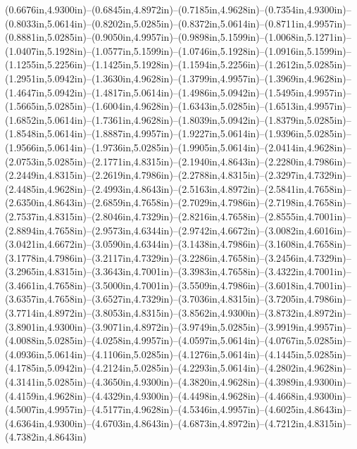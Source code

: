 (0.6676in,4.9300in)--(0.6845in,4.8972in)--(0.7185in,4.9628in)--(0.7354in,4.9300in)--(0.8033in,5.0614in)--(0.8202in,5.0285in)--(0.8372in,5.0614in)--(0.8711in,4.9957in)--(0.8881in,5.0285in)--(0.9050in,4.9957in)--(0.9898in,5.1599in)--(1.0068in,5.1271in)--(1.0407in,5.1928in)--(1.0577in,5.1599in)--(1.0746in,5.1928in)--(1.0916in,5.1599in)--(1.1255in,5.2256in)--(1.1425in,5.1928in)--(1.1594in,5.2256in)--(1.2612in,5.0285in)--(1.2951in,5.0942in)--(1.3630in,4.9628in)--(1.3799in,4.9957in)--(1.3969in,4.9628in)--(1.4647in,5.0942in)--(1.4817in,5.0614in)--(1.4986in,5.0942in)--(1.5495in,4.9957in)--(1.5665in,5.0285in)--(1.6004in,4.9628in)--(1.6343in,5.0285in)--(1.6513in,4.9957in)--(1.6852in,5.0614in)--(1.7361in,4.9628in)--(1.8039in,5.0942in)--(1.8379in,5.0285in)--(1.8548in,5.0614in)--(1.8887in,4.9957in)--(1.9227in,5.0614in)--(1.9396in,5.0285in)--(1.9566in,5.0614in)--(1.9736in,5.0285in)--(1.9905in,5.0614in)--(2.0414in,4.9628in)--(2.0753in,5.0285in)--(2.1771in,4.8315in)--(2.1940in,4.8643in)--(2.2280in,4.7986in)--(2.2449in,4.8315in)--(2.2619in,4.7986in)--(2.2788in,4.8315in)--(2.3297in,4.7329in)--(2.4485in,4.9628in)--(2.4993in,4.8643in)--(2.5163in,4.8972in)--(2.5841in,4.7658in)--(2.6350in,4.8643in)--(2.6859in,4.7658in)--(2.7029in,4.7986in)--(2.7198in,4.7658in)--(2.7537in,4.8315in)--(2.8046in,4.7329in)--(2.8216in,4.7658in)--(2.8555in,4.7001in)--(2.8894in,4.7658in)--(2.9573in,4.6344in)--(2.9742in,4.6672in)--(3.0082in,4.6016in)--(3.0421in,4.6672in)--(3.0590in,4.6344in)--(3.1438in,4.7986in)--(3.1608in,4.7658in)--(3.1778in,4.7986in)--(3.2117in,4.7329in)--(3.2286in,4.7658in)--(3.2456in,4.7329in)--(3.2965in,4.8315in)--(3.3643in,4.7001in)--(3.3983in,4.7658in)--(3.4322in,4.7001in)--(3.4661in,4.7658in)--(3.5000in,4.7001in)--(3.5509in,4.7986in)--(3.6018in,4.7001in)--(3.6357in,4.7658in)--(3.6527in,4.7329in)--(3.7036in,4.8315in)--(3.7205in,4.7986in)--(3.7714in,4.8972in)--(3.8053in,4.8315in)--(3.8562in,4.9300in)--(3.8732in,4.8972in)--(3.8901in,4.9300in)--(3.9071in,4.8972in)--(3.9749in,5.0285in)--(3.9919in,4.9957in)--(4.0088in,5.0285in)--(4.0258in,4.9957in)--(4.0597in,5.0614in)--(4.0767in,5.0285in)--(4.0936in,5.0614in)--(4.1106in,5.0285in)--(4.1276in,5.0614in)--(4.1445in,5.0285in)--(4.1785in,5.0942in)--(4.2124in,5.0285in)--(4.2293in,5.0614in)--(4.2802in,4.9628in)--(4.3141in,5.0285in)--(4.3650in,4.9300in)--(4.3820in,4.9628in)--(4.3989in,4.9300in)--(4.4159in,4.9628in)--(4.4329in,4.9300in)--(4.4498in,4.9628in)--(4.4668in,4.9300in)--(4.5007in,4.9957in)--(4.5177in,4.9628in)--(4.5346in,4.9957in)--(4.6025in,4.8643in)--(4.6364in,4.9300in)--(4.6703in,4.8643in)--(4.6873in,4.8972in)--(4.7212in,4.8315in)--(4.7382in,4.8643in) 